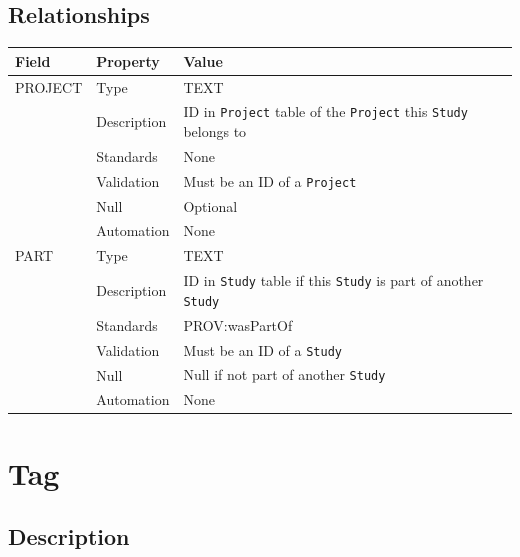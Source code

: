 \documentclass[
]{article}
\newcounter{none} %
\begin{document}
\subsection{Relationships}\label{relationships-28}

{\def\LTcaptype{none} %
\begin{longtable}[]{@{}
  >{\raggedright\arraybackslash}p{}
  >{\raggedright\arraybackslash}p{}
  >{\raggedright\arraybackslash}p{}@{}}
\toprule\noalign{}
\begin{minipage}[b]{\linewidth}\raggedright
Field
\end{minipage} & \begin{minipage}[b]{\linewidth}\raggedright
Property
\end{minipage} & \begin{minipage}[b]{\linewidth}\raggedright
Value
\end{minipage} \\
\midrule\noalign{}
\endhead
\bottomrule\noalign{}
\endlastfoot
PROJECT & Type & TEXT \\
& Description & ID in \texttt{Project} table of the \texttt{Project}
this \texttt{Study} belongs to \\
& Standards & None \\
& Validation & Must be an ID of a \texttt{Project} \\
& Null & Optional \\
& Automation & None \\
PART & Type & TEXT \\
& Description & ID in \texttt{Study} table if this \texttt{Study} is
part of another \texttt{Study} \\
& Standards & PROV:wasPartOf \\
& Validation & Must be an ID of a \texttt{Study} \\
& Null & Null if not part of another \texttt{Study} \\
& Automation & None \\
\end{longtable}
}

\section{Tag}\label{tag}

\subsection{Description}\label{description-33}
\end{document}
